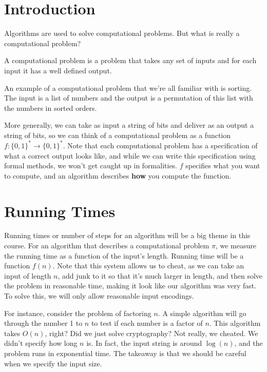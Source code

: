 \section{Introduction}

Algorithms are used to solve computational problems. But what is
really a computational problem?

\begin{definition}
    A computational problem is a problem that takes any set of inputs and for each input it has a well defined output.
\end{definition}

An example of a computational problem that we're all familiar with is sorting. The input is a list of numbers and the output is a permutation of this list with the numbers in sorted orders.

More generally, we can take as input a string of bits and deliver
as an output a string of bits, so we can think of a computational
problem as a function $f: \{0,1\}^* \to \{0,1\}^*$. Note that
each computational problem has a specification of what a correct output
looks like, and while we can write this specification using formal methods, we won't get caught up in formalities. $f$ specifies 
what you want to compute, and an algorithm describes
\textbf{how} you compute the function.

\section{Running Times}

Running times or number of steps for an algorithm will be a big theme
in this course. For an algorithm that describes a computational problem
$\pi$, we measure the running time as a function of the input's length.
Running time will be a function $f(n)$. Note that this system allows
us to cheat, as we can take an input of length $n$, add junk to it
so that it's much larger in length, and then solve the problem in 
reasonable time, making it look like our algorithm was very fast.
To solve this, we will only allow reasonable input encodings.

For instance, consider the problem of factoring $n$. A simple
algorithm will go through the number 1 to $n$ to test if each
number is a factor of $n$. This algorithm takes $O(n)$, right?
Did we just solve cryptography? Not really, we cheated. We didn't
specify how long $n$ is. In fact, the input string is around $\log(n)$,
and the problem runs in exponential time. The takeaway is that we should be careful when we specify the input size.

